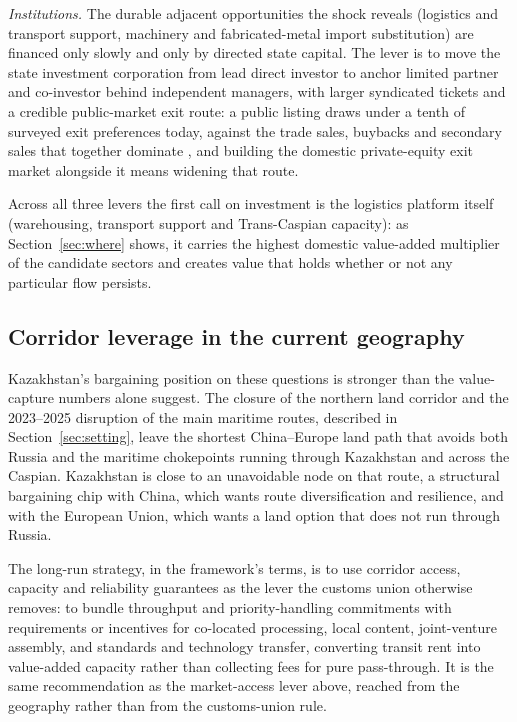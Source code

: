 \documentclass[12pt]{article}
\begin{document}
\emph{Institutions.} The durable adjacent opportunities the shock reveals (logistics and
transport support, machinery and fabricated-metal import substitution) are financed only
slowly and only by directed state capital. The lever is to move the state investment
corporation from lead direct investor to anchor limited partner and co-investor behind
independent managers, with larger syndicated tickets and a credible public-market exit route:
a public listing draws under a tenth of surveyed exit preferences today, against the trade
sales, buybacks and secondary sales that together dominate \citep{qicaifcifc2026pe}, and
building the domestic private-equity exit market alongside it means widening that route.

Across all three levers the first call on investment is the logistics platform itself
(warehousing, transport support and Trans-Caspian capacity): as Section~\ref{sec:where} shows,
it carries the highest domestic value-added multiplier of the candidate sectors and creates
value that holds whether or not any particular flow persists.

\subsection{Corridor leverage in the current geography}

Kazakhstan's bargaining position on these questions is stronger than the value-capture numbers
alone suggest. The closure of the northern land corridor and the 2023--2025 disruption of the
main maritime routes, described in Section~\ref{sec:setting}, leave the shortest China--Europe
land path that avoids both Russia and the maritime chokepoints running through Kazakhstan and
across the Caspian. Kazakhstan is close to an unavoidable node on that route, a structural
bargaining chip with China, which wants route diversification and resilience, and with the
European Union, which wants a land option that does not run through Russia.

The long-run strategy, in the framework's terms, is to use corridor access, capacity and
reliability guarantees as the lever the customs union otherwise removes: to bundle throughput
and priority-handling commitments with requirements or incentives for co-located processing,
local content, joint-venture assembly, and standards and technology transfer, converting
transit rent into value-added capacity rather than collecting fees for pure pass-through. It
is the same recommendation as the market-access lever above, reached from the geography rather
than from the customs-union rule.
\end{document}
